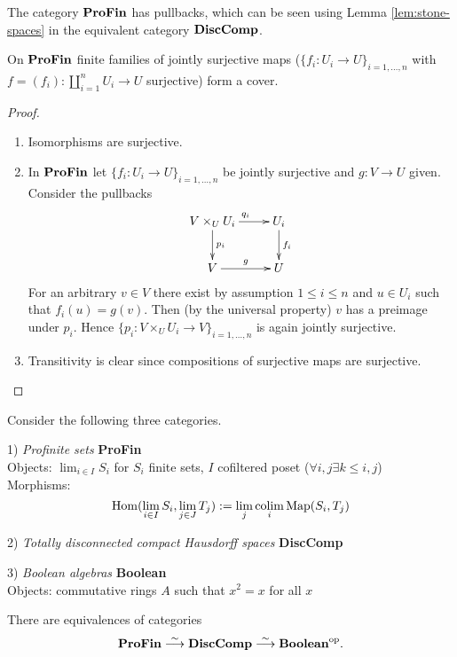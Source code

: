 \documentclass{notes}
\begin{document}
{The category $\mathbf{ProFin}$ has pullbacks, which can be seen using Lemma \ref{lem:stone-spaces} in the equivalent category $\mathbf{DiscComp}$.

\begin{prop}
	On $\mathbf{ProFin}$ finite families of jointly surjective maps ($\{f_i : U_i \rightarrow U\}_{i = 1,\dots,n}$  with $f = (f_i) : \coprod_{i=1}^n U_i \rightarrow U$ surjective) form a cover.
\end{prop}

\begin{proof}
	\begin{enumerate}
		\item Isomorphisms are surjective.
		\item In $\mathbf{ProFin}$ let $\{f_i : U_i \rightarrow U\}_{i = 1,\dots,n}$ be jointly surjective and $g : V \rightarrow U$ given.
		Consider the pullbacks
		$$
		\xymatrix{
			V \times_U U_i \ar[d]^{p_i} \ar[r]^{q_i} & U_i \ar[d]^{f_i} \\
			V \ar[r]^g & U
		}
		$$
		For an arbitrary $v \in V$ there exist by assumption $1 \leq i \leq n$ and $u \in U_i$ such that $f_i(u) = g(v)$.
		Then (by the universal property) $v$ has a preimage under $p_i$.
		Hence $\{p_i : V \times_U U_i \rightarrow V\}_{i = 1,\dots,n}$ is again jointly surjective.
		\item Transitivity is clear since compositions of surjective maps are surjective.
	\end{enumerate}
\end{proof}
}

Consider the following three categories.

1) {\em Profinite sets} {\bf ProFin} \\
Objects: $\lim_{i\in I}S_i$ for $S_i$ finite sets, $I$ cofiltered poset
($\forall i,j \exists k\leq i,j$)
\\
Morphisms: 
$$
  \mathrm{Hom}(\lim_{i\in I}S_i,\lim_{j\in J}T_j) := \lim_j\operatorname*{colim}_i{\rm Map}(S_i,T_j)
$$

2) {\em Totally disconnected compact Hausdorff spaces} {\bf DiscComp}

3) {\em Boolean algebras} {\bf Boolean} \\ 
Objects: commutative rings $A$ such that $x^2=x$ for all $x$ 

\begin{prop}
There are equivalences of categories
$$
  \textbf{ProFin} \stackrel{\sim}\longrightarrow 
  \textbf{DiscComp} \stackrel{\sim}\longrightarrow  
  \textbf{Boolean}^{\rm op}.
$$
\end{prop}
\end{document}
